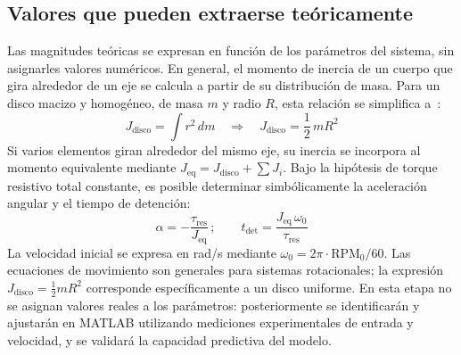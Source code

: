 \subsection{Valores que pueden extraerse teóricamente}
Las magnitudes teóricas se expresan en función de los parámetros del sistema, sin asignarles
valores numéricos. En general, el momento de inercia de un cuerpo que gira alrededor de un eje se
calcula a partir de su distribución de masa. Para un disco macizo y homogéneo, de masa $m$ y radio
$R$, esta relación se simplifica a~\cite{openstax_rotacion}:
\begin{equation}
  J_\text{disco} = \int r^2\,dm
  \quad\Longrightarrow\quad
  J_\text{disco} = \frac{1}{2}\,mR^2
  \label{eq:inercia_disco}
\end{equation}
Si varios elementos giran alrededor del mismo eje, su inercia se incorpora al momento equivalente
mediante $J_\text{eq} = J_\text{disco} + \sum J_i$. Bajo la hipótesis de torque resistivo total
constante, es posible determinar simbólicamente la aceleración angular y el tiempo de detención:
\begin{equation}
  \alpha = -\frac{\tau_\text{res}}{J_\text{eq}}\,;\qquad
  t_\text{det} = \frac{J_\text{eq}\,\omega_0}{\tau_\text{res}}
  \label{eq:alfa_tdet}
\end{equation}
La velocidad inicial se expresa en rad/s mediante $\omega_0 = 2\pi\cdot\text{RPM}_0/60$. Las
ecuaciones de movimiento son generales para sistemas rotacionales; la expresión
$J_\text{disco} = \tfrac{1}{2}mR^2$ corresponde específicamente a un disco uniforme. En esta etapa
no se asignan valores reales a los parámetros: posteriormente se identificarán y ajustarán en
MATLAB utilizando mediciones experimentales de entrada y velocidad, y se validará la capacidad
predictiva del modelo.
